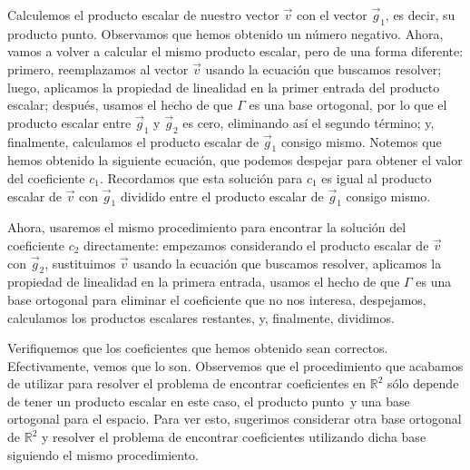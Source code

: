 \documentclass[12pt,dvipsnames]{article}
\numberwithin{equation}{section}
\begin{document}
Calculemos el producto escalar de nuestro vector $\vec{v}$ con el vector $\vec{g}_1$, es decir, su producto punto. Observamos que hemos obtenido un número negativo. Ahora, vamos a volver a calcular el mismo producto escalar, pero de una forma diferente: primero, reemplazamos al vector $\vec{v}$ usando la ecuación que buscamos resolver; luego, aplicamos la propiedad de linealidad en la primer entrada del producto escalar; después, usamos el hecho de que $\Gamma$ es una base ortogonal, por lo que el producto escalar entre $\vec{g}_1$ y $\vec{g}_2$ es cero, eliminando así el segundo término; y, finalmente, calculamos el producto escalar de $\vec{g}_1$ consigo mismo. Notemos que hemos obtenido la siguiente ecuación, que podemos despejar para obtener el valor del coeficiente $c_1$. Recordamos que esta solución para $c_1$ es igual al producto escalar de $\vec{v}$ con $\vec{g}_1$ dividido entre el producto escalar de $\vec{g}_1$ consigo mismo. 

Ahora, usaremos el mismo procedimiento para encontrar la solución del coeficiente $c_2$ directamente: empezamos considerando el producto escalar de $\vec{v}$ con $\vec{g}_2$, sustituimos $\vec{v}$ usando la ecuación que buscamos resolver, aplicamos la propiedad de linealidad en la primera entrada, usamos el hecho de que $\Gamma$ es una base ortogonal para eliminar el coeficiente que no nos interesa, despejamos, calculamos los productos escalares restantes, y, finalmente, dividimos.

Verifiquemos que los coeficientes que hemos obtenido sean correctos. Efectivamente, vemos que lo son. Observemos que el procedimiento que acabamos de utilizar para resolver el problema de encontrar coeficientes en $\mathbb{R}^2$ sólo depende de tener un producto escalar \textemdash en este caso, el producto punto\textemdash \ y una base ortogonal para el espacio. Para ver esto, sugerimos considerar otra base ortogonal de $\mathbb{R}^2$ y resolver el problema de encontrar coeficientes utilizando dicha base siguiendo el mismo procedimiento.


\end{document}
